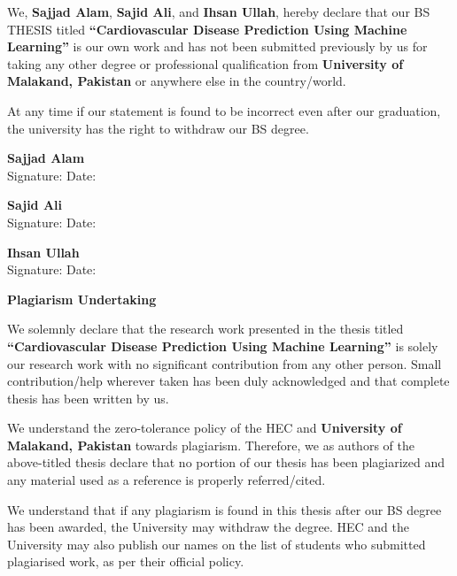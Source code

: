 \documentclass[12pt, a4paper, oneside]{book}
\newcommand{\thesistitle}{Cardiovascular Disease Prediction Using Machine Learning}
\newcommand{\thesisauthorA}{Sajjad Alam}
\newcommand{\thesisauthorB}{Sajid Ali}
\newcommand{\thesisauthorC}{Ihsan Ullah}
\newcommand{\thesisuni}{University of Malakand}
\begin{document}
\noindent We, \textbf{\thesisauthorA}, \textbf{\thesisauthorB}, and \textbf{\thesisauthorC}, hereby declare that our BS THESIS titled \textbf{``\thesistitle''} is our own work and has not been submitted previously by us for taking any other degree or professional qualification from \textbf{\thesisuni, Pakistan} or anywhere else in the country/world.

\noindent At any time if our statement is found to be incorrect even after our graduation, the university has the right to withdraw our BS degree.

\vspace{1.2in}

\noindent \textbf{\thesisauthorA}\\
Signature: \hrulefill \quad Date: \hrulefill

\vspace{0.3in}
\noindent \textbf{\thesisauthorB}\\
Signature: \hrulefill \quad Date: \hrulefill

\vspace{0.3in}
\noindent \textbf{\thesisauthorC}\\
Signature: \hrulefill \quad Date: \hrulefill

\clearpage
\thispagestyle{plain}
\vspace*{0.5cm}
\begin{center}
{\fontsize{14pt}{16pt}\selectfont \textbf{Plagiarism Undertaking}\par}
\end{center}
\vspace{0.4in}

\noindent We solemnly declare that the research work presented in the thesis titled \textbf{``\thesistitle''} is solely our research work with no significant contribution from any other person. Small contribution/help wherever taken has been duly acknowledged and that complete thesis has been written by us.

\noindent We understand the zero-tolerance policy of the HEC and \textbf{\thesisuni, Pakistan} towards plagiarism. Therefore, we as authors of the above-titled thesis declare that no portion of our thesis has been plagiarized and any material used as a reference is properly referred/cited.

\noindent We understand that if any plagiarism is found in this thesis after our BS degree has been awarded, the University may withdraw the degree. HEC and the University may also publish our names on the list of students who submitted plagiarised work, as per their official policy.
\vspace{1.2in}
\end{document}

